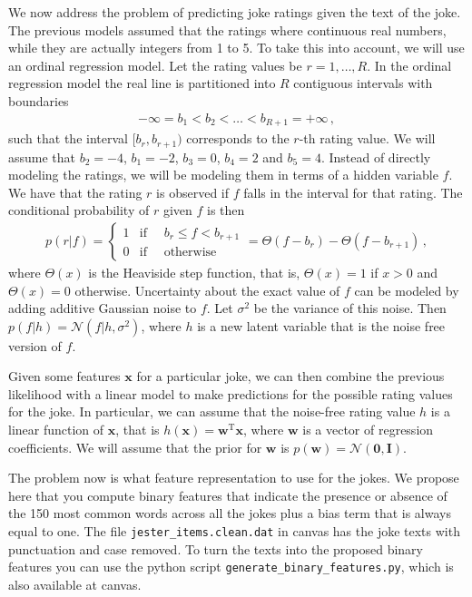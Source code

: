 \documentclass{harvardml}
\theoremstyle{plain}
\begin{document}
We now address the problem of predicting joke ratings given the text of the
joke. The previous models assumed that the ratings where continuous real
numbers, while they are actually integers from 1 to 5. To take this into
account, we will use an ordinal regression model.
Let the rating values
be $r = 1,\ldots,R$. In the ordinal regression model the real line is
partitioned into $R$ contiguous intervals with boundaries
\begin{align}
-\infty = b_1 < b_2 < \ldots < b_{R+1} = +\infty\,,
\end{align}
such that the interval $[b_r,b_{r+1})$ corresponds to the $r$-th rating value.
We will assume that $b_2 = -4$, $b_1 = -2$, $b_3 = 0$, $b_4 = 2$ and $b_5 = 4$.
Instead of directly modeling the ratings, we will be modeling them in terms of a
hidden variable $f$. We have that the rating $r$ is observed
if $f$ falls in the interval for that rating. The conditional probability of
$r$ given $f$ is then
\begin{align}
p(r|f) =
\left\{
    \begin{array}{ll}
        1  & \mbox{if }\quad  b_r \leq f < b_{r+1} \\
        0 & \mbox{if } \quad \mbox{otherwise}
    \end{array}
\right.
= \Theta(f - b_r) - \Theta(f-b_{r+1})\,,
\end{align}
where $\Theta(x)$ is the Heaviside step function, that is, $\Theta(x)=1$ if
$x>0$ and $\Theta(x)=0$ otherwise. Uncertainty about the exact value of $f$ can
be modeled by adding additive Gaussian noise to $f$. Let $\sigma^2$ be the variance
of this noise. Then $p(f|h) = \mathcal{N}(f|h,\sigma^2)$, where $h$ is a new latent
variable that is the noise free version of $f$.

Given some features $\mathbf{x}$ for a particular joke, we can then combine the
previous likelihood with a linear model to make predictions for the possible
rating values for the joke. In particular, we can assume that the noise-free
rating value $h$ is a linear function of $\mathbf{x}$, that is
$h(\mathbf{x})=\mathbf{w}^\text{T} \mathbf{x}$, where $\mathbf{w}$ is a vector
of regression coefficients. We will assume that the prior for $\mathbf{w}$ is
$p(\mathbf{w})=\mathcal{N}(\bm 0, \mathbf{I})$.

The problem now is what feature representation to use for the jokes. We propose
here that you compute binary features that indicate the presence or absence of
the 150 most common words across all the jokes plus a bias term that is always
equal to one. The file \texttt{jester\_items.clean.dat} in canvas has the joke texts with
punctuation and case removed. To turn the texts into the proposed binary features you can use the
python script \texttt{generate\_binary\_features.py}, which is also available at canvas.
\end{document}
